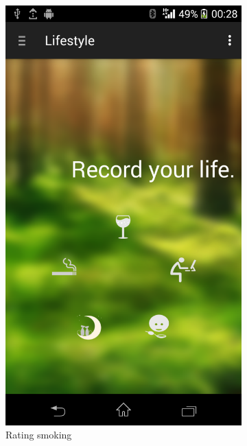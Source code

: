 \begin{figure}
\begin{subfigure}{.24\textwidth}
  \includegraphics[width=.8\linewidth]{img/screenshot/ss9.png}
  \caption{Rating smoking}
\end{subfigure}
\begin{subfigure}{.24\textwidth}
  \centering

\end{subfigure}
\end{figure}
